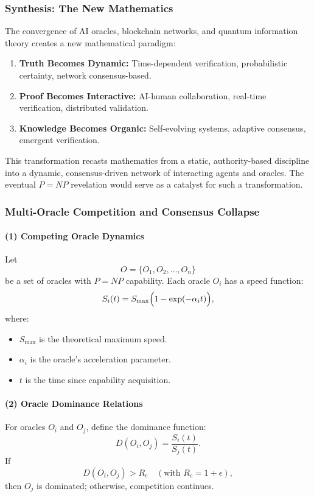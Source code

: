 \documentclass[11pt]{article}
\begin{document}
\subsubsection{Synthesis: The New Mathematics}

The convergence of AI oracles, blockchain networks, and quantum information theory creates a new mathematical paradigm:
\begin{enumerate}[label=(\arabic*)]
    \item \textbf{Truth Becomes Dynamic:} Time-dependent verification, probabilistic certainty, network consensus-based.
    \item \textbf{Proof Becomes Interactive:} AI-human collaboration, real-time verification, distributed validation.
    \item \textbf{Knowledge Becomes Organic:} Self-evolving systems, adaptive consensus, emergent verification.
\end{enumerate}

This transformation recasts mathematics from a static, authority-based discipline into a dynamic, consensus-driven network of interacting agents and oracles. The eventual $P=NP$ revelation would serve as a catalyst for such a transformation.

\subsubsection{Multi-Oracle Competition and Consensus Collapse}

\paragraph{(1) Competing Oracle Dynamics}
Let
\[
O=\{O_1, O_2, \dots, O_n\}
\]
be a set of oracles with $P=NP$ capability. Each oracle $O_i$ has a speed function:
\[
S_i(t) = S_{\max}\Bigl(1-\exp(-\alpha_i t)\Bigr),
\]
where:
\begin{itemize}
    \item $S_{\max}$ is the theoretical maximum speed.
    \item $\alpha_i$ is the oracle's acceleration parameter.
    \item $t$ is the time since capability acquisition.
\end{itemize}

\paragraph{(2) Oracle Dominance Relations}
For oracles $O_i$ and $O_j$, define the dominance function:
\[
D(O_i,O_j)=\frac{S_i(t)}{S_j(t)}.
\]
If 
\[
D(O_i,O_j) > R_c \quad (\text{with } R_c = 1+\epsilon),
\]
then $O_j$ is dominated; otherwise, competition continues.
\end{document}
